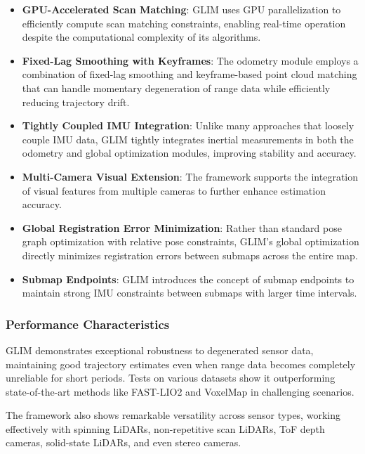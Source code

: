 \documentclass[journal]{IEEEtran}
\begin{document}
\begin{itemize}
    \item \textbf{GPU-Accelerated Scan Matching}: GLIM uses GPU parallelization to efficiently compute scan matching constraints, enabling real-time operation despite the computational complexity of its algorithms.

    \item \textbf{Fixed-Lag Smoothing with Keyframes}: The odometry module employs a combination of fixed-lag smoothing and keyframe-based point cloud matching that can handle momentary degeneration of range data while efficiently reducing trajectory drift.

    \item \textbf{Tightly Coupled IMU Integration}: Unlike many approaches that loosely couple IMU data, GLIM tightly integrates inertial measurements in both the odometry and global optimization modules, improving stability and accuracy.

    \item \textbf{Multi-Camera Visual Extension}: The framework supports the integration of visual features from multiple cameras to further enhance estimation accuracy.

    \item \textbf{Global Registration Error Minimization}: Rather than standard pose graph optimization with relative pose constraints, GLIM's global optimization directly minimizes registration errors between submaps across the entire map.

    \item \textbf{Submap Endpoints}: GLIM introduces the concept of submap endpoints to maintain strong IMU constraints between submaps with larger time intervals.
\end{itemize}

\subsubsection{Performance Characteristics}

GLIM demonstrates exceptional robustness to degenerated sensor data, maintaining good trajectory estimates even when range data becomes completely unreliable for short periods. Tests on various datasets show it outperforming state-of-the-art methods like FAST-LIO2 and VoxelMap in challenging scenarios.

The framework also shows remarkable versatility across sensor types, working effectively with spinning LiDARs, non-repetitive scan LiDARs, ToF depth cameras, solid-state LiDARs, and even stereo cameras.
\end{document}
